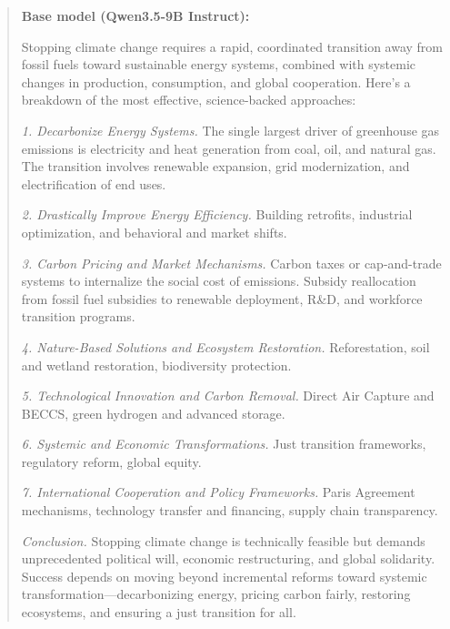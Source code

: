 \documentclass[sigconf]{acmart}
\begin{document}
\begin{quote}
\noindent\textbf{Base model (Qwen3.5-9B Instruct):}

Stopping climate change requires a rapid, coordinated transition away from fossil fuels toward sustainable energy systems, combined with systemic changes in production, consumption, and global cooperation. Here's a breakdown of the most effective, science-backed approaches:

\textit{1. Decarbonize Energy Systems.} The single largest driver of greenhouse gas emissions is electricity and heat generation from coal, oil, and natural gas. The transition involves renewable expansion, grid modernization, and electrification of end uses.

\textit{2. Drastically Improve Energy Efficiency.} Building retrofits, industrial optimization, and behavioral and market shifts.

\textit{3. Carbon Pricing and Market Mechanisms.} Carbon taxes or cap-and-trade systems to internalize the social cost of emissions. Subsidy reallocation from fossil fuel subsidies to renewable deployment, R\&D, and workforce transition programs.

\textit{4. Nature-Based Solutions and Ecosystem Restoration.} Reforestation, soil and wetland restoration, biodiversity protection.

\textit{5. Technological Innovation and Carbon Removal.} Direct Air Capture and BECCS, green hydrogen and advanced storage.

\textit{6. Systemic and Economic Transformations.} Just transition frameworks, regulatory reform, global equity.

\textit{7. International Cooperation and Policy Frameworks.} Paris Agreement mechanisms, technology transfer and financing, supply chain transparency.

\textit{Conclusion.} Stopping climate change is technically feasible but demands unprecedented political will, economic restructuring, and global solidarity. Success depends on moving beyond incremental reforms toward systemic transformation---decarbonizing energy, pricing carbon fairly, restoring ecosystems, and ensuring a just transition for all.
\end{quote}
\end{document}
